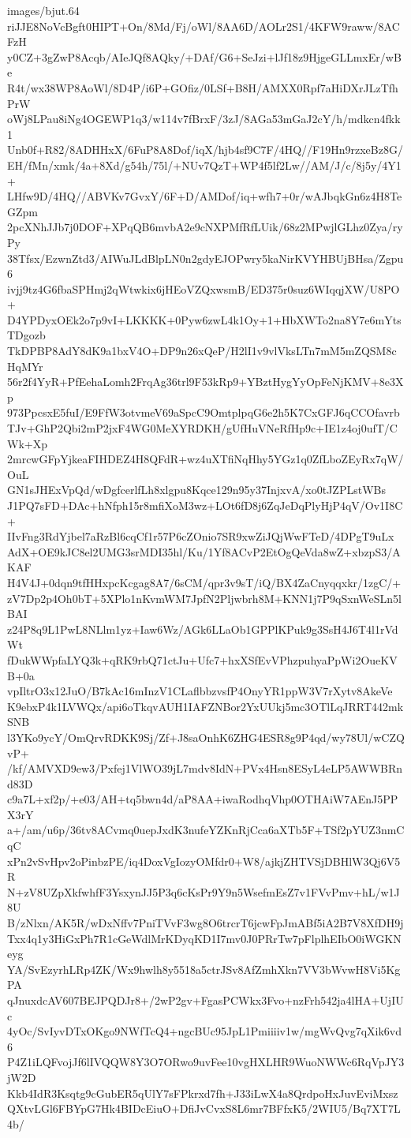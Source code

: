\begin{filecontents*}{images/bjut.64}
riJJE8NoVcBgft0HIPT+On/8Md/Fj/oWl/8AA6D/AOLr2S1/4KFW9raww/8ACFzH
y0CZ+3gZwP8Acqb/AIeJQf8AQky/+DAf/G6+SeJzi+lJf18z9HjgeGLLmxEr/wBe
R4t/wx38WP8AoWl/8D4P/i6P+GOfiz/0LSf+B8H/AMXX0Rpf7aHiDXrJLzTfhPrW
oWj8LPau8iNg4OGEWP1q3/w114v7fBrxF/3zJ/8AGa53mGaJ2cY/h/mdkcn4fkk1
Unb0f+R82/8ADHHxX/6FuP8A8Dof/iqX/hjb4sf9C7F/4HQ//F19Hn9rzxeBz8G/
EH/fMn/xmk/4a+8Xd/g54h/75l/+NUv7QzT+WP4f5lf2Lw//AM/J/c/8j5y/4Y1+
LHfw9D/4HQ//ABVKv7GvxY/6F+D/AMDof/iq+wfh7+0r/wAJbqkGn6z4H8TeGZpm
2pcXNhJJb7j0DOF+XPqQB6mvbA2e9cNXPMfRfLUik/68z2MPwjlGLhz0Zya/ryPy
38Tfsx/EzwnZtd3/AIWuJLdBlpLN0n2gdyEJOPwry5kaNirKVYHBUjBHsa/Zgpu6
ivjj9tz4G6fbaSPHmj2qWtwkix6jHEoVZQxwsmB/ED375r0suz6WIqqjXW/U8PO+
D4YPDyxOEk2o7p9vI+LKKKK+0Pyw6zwL4k1Oy+1+HbXWTo2na8Y7e6mYtsTDgozb
TkDPBP8AdY8dK9a1bxV4O+DP9n26xQeP/H2lI1v9vlVksLTn7mM5mZQSM8cHqMYr
56r2f4YyR+PfEehaLomh2FrqAg36trl9F53kRp9+YBztHygYyOpFeNjKMV+8e3Xp
973PpcsxE5fuI/E9FfW3otvmeV69aSpcC9OmtplpqG6e2h5K7CxGFJ6qCCOfavrb
TJv+GhP2Qbi2mP2jxF4WG0MeXYRDKH/gUfHuVNeRfHp9c+IE1z4oj0ufT/CWk+Xp
2mrcwGFpYjkeaFIHDEZ4H8QFdR+wz4uXTfiNqHhy5YGz1q0ZfLboZEyRx7qW/OuL
GN1sJHExVpQd/wDgfcerlfLh8xlgpu8Kqce129n95y37InjxvA/xo0tJZPLstWBs
J1PQ7sFD+DAc+hNfph15r8mfiXoM3wz+LOt6fD8j6ZqJeDqPlyHjP4qV/Ov1I8C+
IIvFng3RdYjbel7aRzBl6cqCf1r57P6cZOnio7SR9xwZiJQjWwFTeD/4DPgT9uLx
AdX+OE9kJC8el2UMG3srMDI35hl/Ku/1Yf8ACvP2EtOgQeVda8wZ+xbzpS3/AKAF
H4V4J+0dqn9tfHHxpcKcgag8A7/6sCM/qpr3v9sT/iQ/BX4ZaCnyqqxkr/1zgC/+
zV7Dp2p4Oh0bT+5XPlo1nKvmWM7JpfN2Pljwbrh8M+KNN1j7P9qSxnWeSLn5lBAI
z24P8q9L1PwL8NLlm1yz+Iaw6Wz/AGk6LLaOb1GPPlKPuk9g3SsH4J6T4l1rVdWt
fDukWWpfaLYQ3k+qRK9rbQ71ctJu+Ufc7+hxXSfEvVPhzpuhyaPpWi2OueKVB+0a
vpIltrO3x12JuO/B7kAc16mInzV1CLaflbbzvsfP4OnyYR1ppW3V7rXytv8AkeVe
K9ebxP4k1LVWQx/api6oTkqvAUH1IAFZNBor2YxUUkj5mc3OTlLqJRRT442mkSNB
l3YKo9ycY/OmQrvRDKK9Sj/Zf+J8saOnhK6ZHG4ESR8g9P4qd/wy78Ul/wCZQvP+
/kf/AMVXD9ew3/Pxfej1VlWO39jL7mdv8IdN+PVx4Hsn8ESyL4eLP5AWWBRnd83D
c9a7L+xf2p/+e03/AH+tq5bwn4d/aP8AA+iwaRodhqVhp0OTHAiW7AEnJ5PPX3rY
a+/am/u6p/36tv8ACvmq0uepJxdK3nufeYZKnRjCca6aXTb5F+TSf2pYUZ3nmCqC
xPn2vSvHpv2oPinbzPE/iq4DoxVgIozyOMfdr0+W8/ajkjZHTVSjDBHlW3Qj6V5R
N+zV8UZpXkfwhfF3YsxynJJ5P3q6cKsPr9Y9n5WsefmEsZ7v1FVvPmv+hL/w1J8U
B/zNlxn/AK5R/wDxNffv7PniTVvF3wg8O6trcrT6jcwFpJmABf5iA2B7V8XfDH9j
Txx4q1y3HiGxPh7R1cGeWdlMrKDyqKD1I7mv0J0PRrTw7pFlplhEIbO0iWGKNeyg
YA/SvEzyrhLRp4ZK/Wx9hwlh8y5518a5ctrJSv8AfZmhXkn7VV3bWvwH8Vi5KgPA
qJnuxdcAV607BEJPQDJr8+/2wP2gv+FgasPCWkx3Fvo+nzFrh542ja4lHA+UjIUc
4yOc/SvIyvDTxOKgo9NWfTcQ4+ngcBUc95JpL1Pmiiiiv1w/mgWvQvg7qXik6vd6
P4Z1iLQFvojJf6lIVQQW8Y3O7ORwo9uvFee10vgHXLHR9WuoNWWc6RqVpJY3jW2D
Kkb4IdR3Ksqtg9cGubER5qUlY7sFPkrxd7fh+J33iLwX4a8QrdpoHxJuvEviMxsz
QXtvLGl6FBYpG7Hk4BIDcEiuO+DfiJvCvxS8L6mr7BFfxK5/2WIU5/Bq7XT7L4b/

\end{filecontents*}
